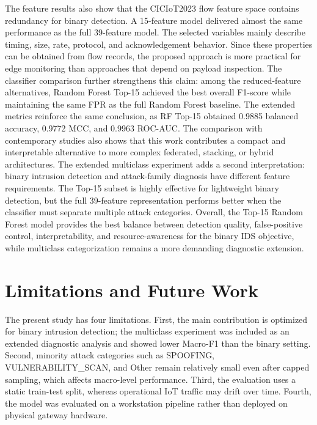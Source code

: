 \documentclass[journal]{IEEEtran}
\begin{document}
The feature results also show that the CICIoT2023 flow feature space contains redundancy for binary detection. A 15-feature model delivered almost the same performance as the full 39-feature model. The selected variables mainly describe timing, size, rate, protocol, and acknowledgement behavior. Since these properties can be obtained from flow records, the proposed approach is more practical for edge monitoring than approaches that depend on payload inspection. The classifier comparison further strengthens this claim: among the reduced-feature alternatives, Random Forest Top-15 achieved the best overall F1-score while maintaining the same FPR as the full Random Forest baseline. The extended metrics reinforce the same conclusion, as RF Top-15 obtained 0.9885 balanced accuracy, 0.9772 MCC, and 0.9963 ROC-AUC. The comparison with contemporary studies also shows that this work contributes a compact and interpretable alternative to more complex federated, stacking, or hybrid architectures. The extended multiclass experiment adds a second interpretation: binary intrusion detection and attack-family diagnosis have different feature requirements. The Top-15 subset is highly effective for lightweight binary detection, but the full 39-feature representation performs better when the classifier must separate multiple attack categories. Overall, the Top-15 Random Forest model provides the best balance between detection quality, false-positive control, interpretability, and resource-awareness for the binary IDS objective, while multiclass categorization remains a more demanding diagnostic extension.

\section{Limitations and Future Work}
\label{sec:limitations}

The present study has four limitations. First, the main contribution is optimized for binary intrusion detection; the multiclass experiment was included as an extended diagnostic analysis and showed lower Macro-F1 than the binary setting. Second, minority attack categories such as SPOOFING, VULNERABILITY\_SCAN, and Other remain relatively small even after capped sampling, which affects macro-level performance. Third, the evaluation uses a static train-test split, whereas operational IoT traffic may drift over time. Fourth, the model was evaluated on a workstation pipeline rather than deployed on physical gateway hardware.
\end{document}
